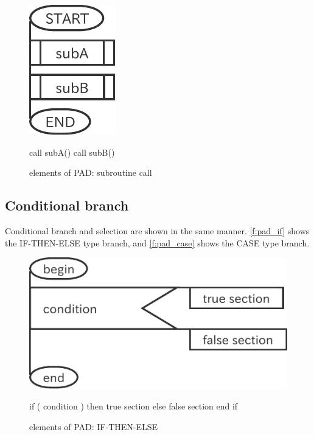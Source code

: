 \begin{figure}[htbp]
\begin{minipage}{.49\textwidth}
 \center
  \includegraphics[scale=0.7]{figs/pad_routinecall.pdf}
\end{minipage}
\begin{minipage}{.49\textwidth}
\begin{LstF90}[numbers=none]
 call subA()
 call subB()
\end{LstF90}
\end{minipage}
 \caption{elements of PAD: subroutine call}
 \label{f:pad_call}
\end{figure}

\subsection{Conditional branch}

Conditional branch and selection are shown in the same manner.
\autoref{f:pad_if} shows the IF-THEN-ELSE type branch, and
\autoref{f:pad_case} shows the CASE type branch.

\begin{figure}[htbp]
\begin{minipage}{.49\textwidth}
 \center
  \includegraphics[scale=0.7]{figs/pad_ifelse.pdf}
\end{minipage}
\begin{minipage}{.49\textwidth}
\begin{LstF90}[numbers=none]
 if ( condition ) then
   true section
 else
   false section
 end if
\end{LstF90}
\end{minipage}
\caption{elements of PAD: IF-THEN-ELSE}
\label{f:pad_if}
\end{figure}

